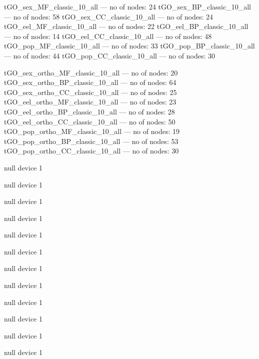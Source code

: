 \documentclass[10pt]{bmc_article}
\newenvironment{bmcformat}{\begin{raggedright}\baselineskip20pt\sloppy\setboolean{publ}{false}}{\end{raggedright}\baselineskip20pt\sloppy}
\begin{document}
\begin{bmcformat}
  




\begin{Schunk}
\begin{Soutput}
tGO_sex_MF_classic_10_all  --- no of nodes:  24 
tGO_sex_BP_classic_10_all  --- no of nodes:  58 
tGO_sex_CC_classic_10_all  --- no of nodes:  24 
tGO_eel_MF_classic_10_all  --- no of nodes:  22 
tGO_eel_BP_classic_10_all  --- no of nodes:  14 
tGO_eel_CC_classic_10_all  --- no of nodes:  48 
tGO_pop_MF_classic_10_all  --- no of nodes:  33 
tGO_pop_BP_classic_10_all  --- no of nodes:  44 
tGO_pop_CC_classic_10_all  --- no of nodes:  30 
\end{Soutput}
\begin{Soutput}
tGO_sex_ortho_MF_classic_10_all  --- no of nodes:  20 
tGO_sex_ortho_BP_classic_10_all  --- no of nodes:  64 
tGO_sex_ortho_CC_classic_10_all  --- no of nodes:  25 
tGO_eel_ortho_MF_classic_10_all  --- no of nodes:  23 
tGO_eel_ortho_BP_classic_10_all  --- no of nodes:  28 
tGO_eel_ortho_CC_classic_10_all  --- no of nodes:  50 
tGO_pop_ortho_MF_classic_10_all  --- no of nodes:  19 
tGO_pop_ortho_BP_classic_10_all  --- no of nodes:  53 
tGO_pop_ortho_CC_classic_10_all  --- no of nodes:  30 
\end{Soutput}
\end{Schunk}




\begin{Schunk}
\begin{Soutput}
null device 
          1 
\end{Soutput}
\begin{Soutput}
null device 
          1 
\end{Soutput}
\begin{Soutput}
null device 
          1 
\end{Soutput}
\begin{Soutput}
null device 
          1 
\end{Soutput}
\begin{Soutput}
null device 
          1 
\end{Soutput}
\begin{Soutput}
null device 
          1 
\end{Soutput}
\begin{Soutput}
null device 
          1 
\end{Soutput}
\begin{Soutput}
null device 
          1 
\end{Soutput}
\begin{Soutput}
null device 
          1 
\end{Soutput}
\begin{Soutput}
null device 
          1 
\end{Soutput}
\begin{Soutput}
null device 
          1 
\end{Soutput}
\begin{Soutput}
null device 
          1 
\end{Soutput}
\end{Schunk}



\end{bmcformat}
\end{document}
